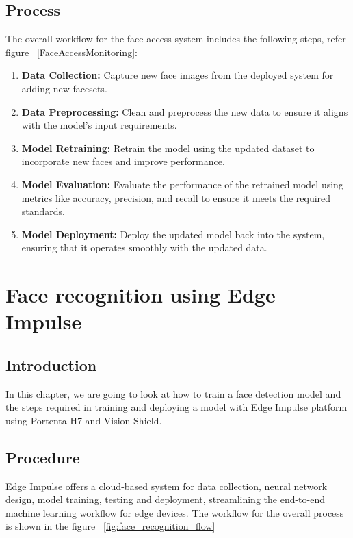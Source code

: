 \section{Process}

The overall workflow for the face access system includes the following steps, refer figure ~\ref{FaceAccessMonitoring}:

\begin{enumerate}
	\item \textbf{Data Collection:} Capture new face images from the deployed system for adding new facesets.
	\item \textbf{Data Preprocessing:} Clean and preprocess the new data to ensure it aligns with the model’s input requirements.
	\item \textbf{Model Retraining:} Retrain the model using the updated dataset to incorporate new faces and improve performance.
	\item \textbf{Model Evaluation:} Evaluate the performance of the retrained model using metrics like accuracy, precision, and recall to ensure it meets the required standards.
	\item \textbf{Model Deployment:} Deploy the updated model back into the system, ensuring that it operates smoothly with the updated data.
\end{enumerate}



\chapter{Face recognition using Edge Impulse}

\section{Introduction}

In this chapter, we are going to look at how to train a face detection model and the steps required in training and deploying a model with Edge Impulse platform using Portenta H7 and Vision Shield.

\section{Procedure}

Edge Impulse offers a cloud-based system for data collection, neural network design, model training, testing and deployment, streamlining the end-to-end machine learning workflow for edge devices. The workflow for the overall process is shown in the figure ~\ref{fig:face_recognition_flow}

